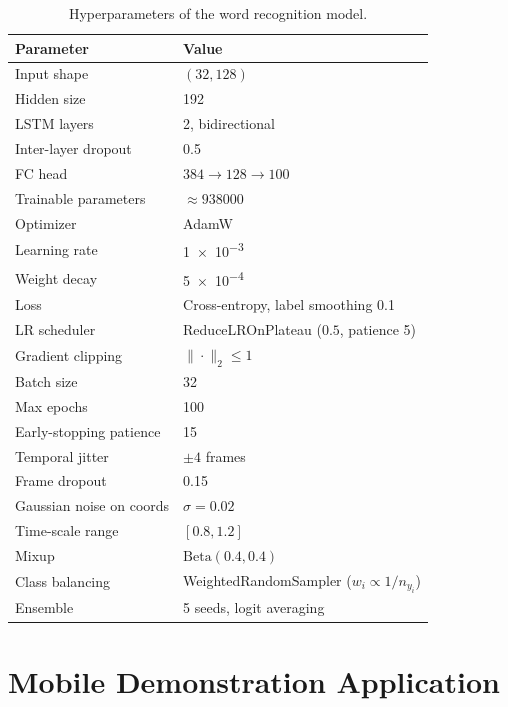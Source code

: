 \begin{table}[!ht]
\centering
\caption{Hyperparameters of the word recognition model.}
\label{tab:impl-lstm-hparams}
\begin{tabular}{ll}
\toprule
\textbf{Parameter} & \textbf{Value} \\
\midrule
Input shape                & $(32, 128)$ \\
Hidden size                & 192 \\
LSTM layers                & 2, bidirectional \\
Inter-layer dropout        & 0.5 \\
FC head                    & $384 \rightarrow 128 \rightarrow 100$ \\
Trainable parameters       & $\approx \num{938000}$ \\
Optimizer                  & AdamW \\
Learning rate              & \num{1e-3} \\
Weight decay               & \num{5e-4} \\
Loss                       & Cross-entropy, label smoothing 0.1 \\
LR scheduler               & ReduceLROnPlateau ($0.5$, patience 5) \\
Gradient clipping          & $\|\cdot\|_2 \leq 1$ \\
Batch size                 & 32 \\
Max epochs                 & 100 \\
Early-stopping patience    & 15 \\
Temporal jitter            & $\pm 4$ frames \\
Frame dropout              & 0.15 \\
Gaussian noise on coords   & $\sigma = 0.02$ \\
Time-scale range           & $[0.8, 1.2]$ \\
Mixup                      & $\mathrm{Beta}(0.4, 0.4)$ \\
Class balancing            & WeightedRandomSampler ($w_i \propto 1 / n_{y_i}$) \\
Ensemble                   & 5 seeds, logit averaging \\
\bottomrule
\end{tabular}
\end{table}

\section{Mobile Demonstration Application}
\label{sec:impl-android}


